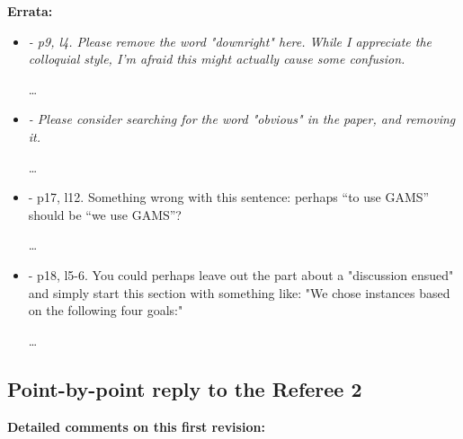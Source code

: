 \documentclass[11pt]{article}
\newcommand{\rep}[1]{{\textcolor{acblue}{#1}}}
\begin{document}
\bigskip
\textbf{Errata:}

 \begin{itemize}
 
\item 
{\it
- p9, l4. Please remove the word "downright" here. While I appreciate the colloquial style, I'm afraid this might actually cause some confusion. 
}

\rep{\dots}

\item 
{\it
- Please consider searching for the word "obvious" in the paper, and removing it. 
}

\rep{\dots}

\item 
{\it

- p17, l12. Something wrong with this sentence: perhaps ``to use GAMS'' should be ``we use GAMS''? 
}

\rep{\dots}

\item 
{\it

- p18, l5-6. You could perhaps leave out the part about a "discussion ensued" and simply start this section with something like: "We chose instances based on the following four goals:" 
}

\rep{\dots}

 
\end{itemize}


\subsection*{Point-by-point reply to the Referee 2}

\bigskip
\textbf{
Detailed comments on this first revision: 
}
\end{document}
